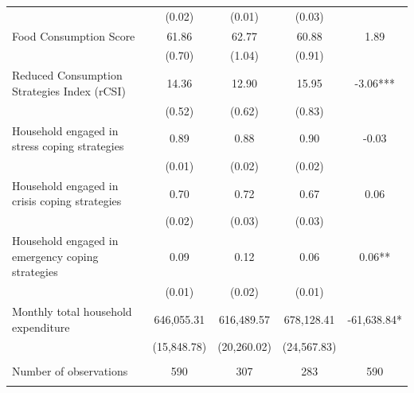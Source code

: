 \begin{tabular}{@{\extracolsep{5pt}}lcccc}
 & (0.02)  & (0.01)  & (0.03)  &  \\ [1ex]
Food Consumption Score   & 61.86    & 62.77    & 60.88    & 1.89   \\
 & (0.70)  & (1.04)  & (0.91)  &  \\ [1ex]
Reduced Consumption Strategies Index (rCSI)   & 14.36    & 12.90    & 15.95    & -3.06***   \\
 & (0.52)  & (0.62)  & (0.83)  &  \\ [1ex]
Household engaged in stress coping strategies   & 0.89    & 0.88    & 0.90    & -0.03   \\
 & (0.01)  & (0.02)  & (0.02)  &  \\ [1ex]
Household engaged in crisis coping strategies   & 0.70    & 0.72    & 0.67    & 0.06   \\
 & (0.02)  & (0.03)  & (0.03)  &  \\ [1ex]
Household engaged in emergency coping strategies   & 0.09    & 0.12    & 0.06    & 0.06**   \\
 & (0.01)  & (0.02)  & (0.01)  &  \\ [1ex]
Monthly total household expenditure   & 646,055.31    & 616,489.57    & 678,128.41    & -61,638.84*   \\
 & (15,848.78)  & (20,260.02)  & (24,567.83)  &  \\ [1ex]
\hline \\[-1.8ex]
Number of observations  & 590   & 307   & 283  & 590  \\
\hline \hline \\[-1.8ex]

\end{tabular}
